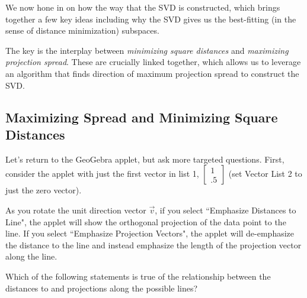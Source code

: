 \documentclass{ximera}
\begin{document}
We now hone in on how the way that the SVD is constructed, which brings together a few key ideas including why the SVD gives us the best-fitting (in the sense of distance minimization) subspaces. 

The key is the interplay between \emph{minimizing square distances} and \emph{maximizing projection spread}. These are crucially linked together, which allows us to leverage an algorithm that finds direction of maximum projection spread to construct the SVD. 

\subsection*{Maximizing Spread and Minimizing Square Distances}

Let's return to the GeoGebra applet, but ask more targeted questions. First, consider the applet with just the first vector in list 1, $\begin{bmatrix}
  1\\.5
\end{bmatrix}$ (set Vector List 2 to just the zero vector).

\begin{center}
\end{center}

As you rotate the unit direction vector $\vec{v}$, if you select ``Emphasize Distances to Line", the applet will show the orthogonal projection of the data point to the line. If you select ``Emphasize Projection Vectors", the applet will de-emphasize the distance to the line and instead emphasize the length of the projection vector along the line. 

Which of the following statements is true of the relationship between the distances to and projections along the possible lines?
\end{document}
